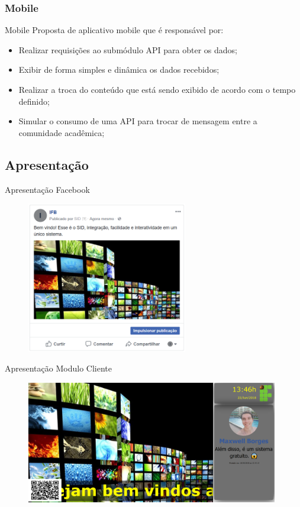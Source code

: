 \documentclass{aula-ifb}
\begin{document}
\subsubsection{Mobile}
\begin{frame}{Mobile}
Proposta de aplicativo mobile que é responsável por:
\begin{itemize}
   \item Realizar requisições ao submódulo API para obter os dados;
   \vspace{10px}
   \item Exibir de forma simples e dinâmica os dados recebidos;
   \vspace{10px}
   \item Realizar a troca do conteúdo que está sendo exibido de acordo com o tempo definido;
   \vspace{10px}
   \item Simular o consumo de uma API para trocar de mensagem entre a comunidade acadêmica;
\end{itemize}
\end{frame}

\subsection{Apresentação}
\begin{frame}{Apresentação Facebook}
\begin{figure}[h]
\includegraphics[width=7cm]{figuras/imgfacebook1.png}
\label{fig:facebookgraph}
\end{figure}
\end{frame}

\begin{frame}{Apresentação Modulo Cliente}
\begin{figure}[h]
\includegraphics[width=11cm]{figuras/funcionalidadeexibir.png}
\label{fig:facebookgraph}
\end{figure}
\end{frame}
\end{document}
